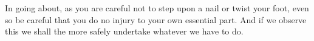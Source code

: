 In going about, as you are careful not  to step upon a nail or twist your foot,
even so be careful that you do no  injury to your own essential part. And if we
observe this we shall the more safely undertake whatever we have to do.
